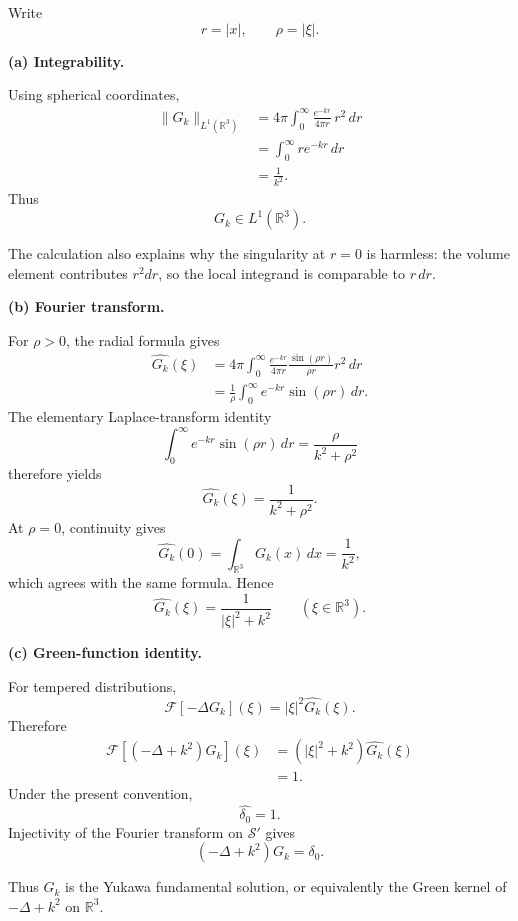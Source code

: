 \begin{solution}
Write
\[
r=|x|,
\qquad
\rho=|\xi|.
\]

\par\smallskip\noindent\textbf{(a) Integrability.}

Using spherical coordinates,
\[
\begin{aligned}
\|G_k\|_{L^1(\mathbb R^3)}
&=
4\pi
\int_0^\infty
\frac{e^{-kr}}{4\pi r}\,r^2\,dr\\
&=
\int_0^\infty
r e^{-kr}\,dr\\
&=
\frac1{k^2}.
\end{aligned}
\]
Thus
\[
\boxed{G_k\in L^1(\mathbb R^3).}
\]

The calculation also explains why the singularity at \(r=0\) is harmless:
the volume element contributes \(r^2dr\), so the local integrand is
comparable to \(r\,dr\).

\par\smallskip\noindent\textbf{(b) Fourier transform.}

For \(\rho>0\), the radial formula gives
\[
\begin{aligned}
\widehat{G_k}(\xi)
&=
4\pi
\int_0^\infty
\frac{e^{-kr}}{4\pi r}
\frac{\sin(\rho r)}{\rho r}
r^2\,dr\\
&=
\frac1{\rho}
\int_0^\infty
e^{-kr}\sin(\rho r)\,dr.
\end{aligned}
\]
The elementary Laplace-transform identity
\[
\int_0^\infty
e^{-kr}\sin(\rho r)\,dr
=
\frac{\rho}{k^2+\rho^2}
\]
therefore yields
\[
\widehat{G_k}(\xi)
=
\frac1{k^2+\rho^2}.
\]
At \(\rho=0\), continuity gives
\[
\widehat{G_k}(0)
=
\int_{\mathbb R^3}G_k(x)\,dx
=
\frac1{k^2},
\]
which agrees with the same formula. Hence
\[
\boxed{
\widehat{G_k}(\xi)
=
\frac1{|\xi|^2+k^2}
\qquad(\xi\in\mathbb R^3).}
\]

\par\smallskip\noindent\textbf{(c) Green-function identity.}

For tempered distributions,
\[
\mathcal F[-\Delta G_k](\xi)
=
|\xi|^2\widehat{G_k}(\xi).
\]
Therefore
\[
\begin{aligned}
\mathcal F[(-\Delta+k^2)G_k](\xi)
&=
(|\xi|^2+k^2)
\widehat{G_k}(\xi)\\
&=1.
\end{aligned}
\]
Under the present convention,
\[
\widehat{\delta_0}=1.
\]
Injectivity of the Fourier transform on \(\mathcal S'\) gives
\[
\boxed{
(-\Delta+k^2)G_k=\delta_0.}
\]

Thus \(G_k\) is the Yukawa fundamental solution, or equivalently the
Green kernel of \(-\Delta+k^2\) on \(\mathbb R^3\).
\end{solution}


